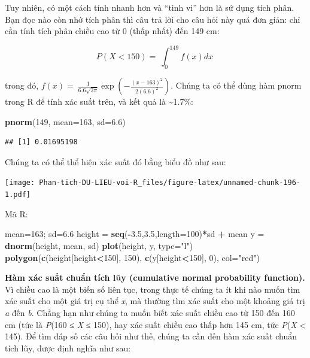 \documentclass[
]{book}
\newenvironment{Shaded}{\begin{snugshade}}{\end{snugshade}}
\newcommand{\DataTypeTok}[1]{\textcolor[rgb]{0.13,0.29,0.53}{#1}}
\newcommand{\DecValTok}[1]{\textcolor[rgb]{0.00,0.00,0.81}{#1}}
\newcommand{\FloatTok}[1]{\textcolor[rgb]{0.00,0.00,0.81}{#1}}
\newcommand{\KeywordTok}[1]{\textcolor[rgb]{0.13,0.29,0.53}{\textbf{#1}}}
\newcommand{\NormalTok}[1]{#1}
\newcommand{\OperatorTok}[1]{\textcolor[rgb]{0.81,0.36,0.00}{\textbf{#1}}}
\newcommand{\StringTok}[1]{\textcolor[rgb]{0.31,0.60,0.02}{#1}}
\begin{document}
Tuy nhiên, có một cách tính nhanh hơn và ``tinh vi'' hơn là sử dụng tích phân. Bạn đọc nào còn nhớ tích phân thì câu trả lời cho câu hỏi này quá đơn giản: chỉ cần tính tích phân chiều cao từ 0 (thấp nhất) đến 149 cm:

\[P\left( X < 150 \right) = \ \int_{0}^{149}{f(x)dx}\ \]

trong đó,
\(f\left( x \right) = \ \frac{1}{6.6\sqrt{2\pi}}\exp\left( - \frac{\left( x - 163 \right)^{2}}{2{(6.6)}^{2}} \right)\). Chúng ta có thể dùng hàm pnorm trong R để tính xác suất trên, và kết quả là \textasciitilde1.7\%:

\begin{Shaded}
\begin{Highlighting}[]
\KeywordTok{pnorm}\NormalTok{(}\DecValTok{149}\NormalTok{, }\DataTypeTok{mean=}\DecValTok{163}\NormalTok{, }\DataTypeTok{sd=}\FloatTok{6.6}\NormalTok{)}
\end{Highlighting}
\end{Shaded}

\begin{verbatim}
## [1] 0.01695198
\end{verbatim}

Chúng ta có thể thể hiện xác suất đó bằng biểu đồ như sau:

\texttt{[image: Phan-tich-DU-LIEU-voi-R\_files/figure-latex/unnamed-chunk-196-1.pdf]}

Mã R:

\begin{Shaded}
\begin{Highlighting}[]
\NormalTok{mean=}\DecValTok{163}\NormalTok{; sd=}\FloatTok{6.6}
\NormalTok{height =}\StringTok{ }\KeywordTok{seq}\NormalTok{(}\OperatorTok{{-}}\FloatTok{3.5}\NormalTok{,}\FloatTok{3.5}\NormalTok{,}\DataTypeTok{length=}\DecValTok{100}\NormalTok{)}\OperatorTok{*}\NormalTok{sd }\OperatorTok{+}\StringTok{ }\NormalTok{mean}
\NormalTok{y =}\StringTok{ }\KeywordTok{dnorm}\NormalTok{(height, mean, sd)}
\KeywordTok{plot}\NormalTok{(height, y, }\DataTypeTok{type=}\StringTok{"l"}\NormalTok{)}
\KeywordTok{polygon}\NormalTok{(}\KeywordTok{c}\NormalTok{(height[height}\OperatorTok{\textless{}}\DecValTok{150}\NormalTok{], }\DecValTok{150}\NormalTok{), }\KeywordTok{c}\NormalTok{(y[height}\OperatorTok{\textless{}}\DecValTok{150}\NormalTok{], }\DecValTok{0}\NormalTok{), }\DataTypeTok{col=}\StringTok{"red"}\NormalTok{)}
\end{Highlighting}
\end{Shaded}

\textbf{Hàm xác suất chuẩn tích lũy (cumulative normal probability function).} Vì chiều cao là một biến số liên tục, trong thực tế chúng ta ít khi nào muốn tìm xác suất cho một giá trị cụ thể \emph{x}, mà thường tìm xác suất cho một khoảng giá trị \emph{a} đến \emph{b}. Chẳng hạn như chúng ta muốn biết xác suất chiều cao từ 150 đến 160 cm (tức là \emph{P}(160 ≤ \emph{X} ≤ 150), hay xác suất chiều cao thấp hơn 145 cm, tức \emph{P}(\emph{X} \textless{} 145). Để tìm đáp số các câu hỏi như thế, chúng ta cần đến hàm xác suất chuẩn tích lũy, được định nghĩa như sau:
\end{document}
